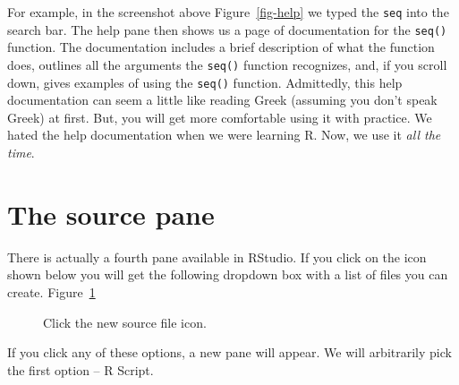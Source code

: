 \documentclass[
  letterpaper,
  DIV=11,
  numbers=noendperiod]{scrreprt}
\begin{document}
For example, in the screenshot above Figure~\ref{fig-help} we typed the
\texttt{seq} into the search bar. The help pane then shows us a page of
documentation for the \texttt{seq()} function. The documentation
includes a brief description of what the function does, outlines all the
arguments the \texttt{seq()} function recognizes, and, if you scroll
down, gives examples of using the \texttt{seq()} function. Admittedly,
this help documentation can seem a little like reading Greek (assuming
you don't speak Greek) at first. But, you will get more comfortable
using it with practice. We hated the help documentation when we were
learning R. Now, we use it \emph{all the time}.

\section{The source pane}\label{the-source-pane}

There is actually a fourth pane available in RStudio. If you click on
the icon shown below you will get the following dropdown box with a list
of files you can create. Figure~\ref{fig-source1}

\begin{figure}


\caption{\label{fig-source1}Click the new source file icon.}

\end{figure}%

If you click any of these options, a new pane will appear. We will
arbitrarily pick the first option -- R Script.
\end{document}
